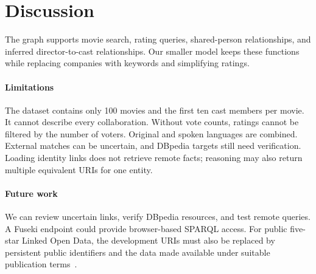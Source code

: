 \section{Discussion}\label{sec:discussion}
The graph supports movie search, rating queries, shared-person relationships, and inferred director-to-cast relationships. Our smaller model keeps these functions while replacing companies with keywords and simplifying ratings.

\paragraph{Limitations}
The dataset contains only 100 movies and the first ten cast members per movie. It cannot describe every collaboration. Without vote counts, ratings cannot be filtered by the number of voters. Original and spoken languages are combined. External matches can be uncertain, and DBpedia targets still need verification. Loading identity links does not retrieve remote facts; reasoning may also return multiple equivalent URIs for one entity.

\paragraph{Future work}
We can review uncertain links, verify DBpedia resources, and test remote queries. A Fuseki endpoint could provide browser-based SPARQL access. For public five-star Linked Open Data, the development URIs must also be replaced by persistent public identifiers and the data made available under suitable publication terms~\cite{bernerslee2006linkeddata}.
